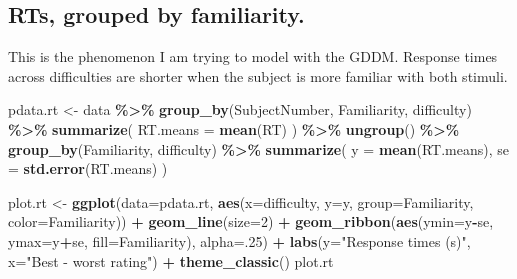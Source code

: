 \documentclass[
]{book}
\newenvironment{Shaded}{\begin{snugshade}}{\end{snugshade}}
\newcommand{\AttributeTok}[1]{\textcolor[rgb]{0.13,0.29,0.53}{#1}}
\newcommand{\DecValTok}[1]{\textcolor[rgb]{0.00,0.00,0.81}{#1}}
\newcommand{\FunctionTok}[1]{\textcolor[rgb]{0.13,0.29,0.53}{\textbf{#1}}}
\newcommand{\NormalTok}[1]{#1}
\newcommand{\OtherTok}[1]{\textcolor[rgb]{0.56,0.35,0.01}{#1}}
\newcommand{\SpecialCharTok}[1]{\textcolor[rgb]{0.81,0.36,0.00}{\textbf{#1}}}
\newcommand{\StringTok}[1]{\textcolor[rgb]{0.31,0.60,0.02}{#1}}
\begin{document}
\hypertarget{rts-grouped-by-familiarity.}{%
\subsection{RTs, grouped by familiarity.}\label{rts-grouped-by-familiarity.}}

This is the phenomenon I am trying to model with the GDDM. Response times across difficulties are shorter when the subject is more familiar with both stimuli.

\begin{Shaded}
\begin{Highlighting}[]
\NormalTok{pdata.rt }\OtherTok{\textless{}{-}}\NormalTok{ data }\SpecialCharTok{\%\textgreater{}\%}
  \FunctionTok{group\_by}\NormalTok{(SubjectNumber, Familiarity, difficulty) }\SpecialCharTok{\%\textgreater{}\%}
  \FunctionTok{summarize}\NormalTok{(}
    \AttributeTok{RT.means =} \FunctionTok{mean}\NormalTok{(RT)}
\NormalTok{  ) }\SpecialCharTok{\%\textgreater{}\%}
  \FunctionTok{ungroup}\NormalTok{() }\SpecialCharTok{\%\textgreater{}\%}
  \FunctionTok{group\_by}\NormalTok{(Familiarity, difficulty) }\SpecialCharTok{\%\textgreater{}\%}
  \FunctionTok{summarize}\NormalTok{(}
    \AttributeTok{y =} \FunctionTok{mean}\NormalTok{(RT.means),}
    \AttributeTok{se =} \FunctionTok{std.error}\NormalTok{(RT.means)}
\NormalTok{  )}

\NormalTok{plot.rt }\OtherTok{\textless{}{-}} \FunctionTok{ggplot}\NormalTok{(}\AttributeTok{data=}\NormalTok{pdata.rt, }\FunctionTok{aes}\NormalTok{(}\AttributeTok{x=}\NormalTok{difficulty, }\AttributeTok{y=}\NormalTok{y, }\AttributeTok{group=}\NormalTok{Familiarity, }\AttributeTok{color=}\NormalTok{Familiarity)) }\SpecialCharTok{+}
  \FunctionTok{geom\_line}\NormalTok{(}\AttributeTok{size=}\DecValTok{2}\NormalTok{) }\SpecialCharTok{+}
  \FunctionTok{geom\_ribbon}\NormalTok{(}\FunctionTok{aes}\NormalTok{(}\AttributeTok{ymin=}\NormalTok{y}\SpecialCharTok{{-}}\NormalTok{se, }\AttributeTok{ymax=}\NormalTok{y}\SpecialCharTok{+}\NormalTok{se, }\AttributeTok{fill=}\NormalTok{Familiarity), }\AttributeTok{alpha=}\NormalTok{.}\DecValTok{25}\NormalTok{) }\SpecialCharTok{+}
  \FunctionTok{labs}\NormalTok{(}\AttributeTok{y=}\StringTok{"Response times (s)"}\NormalTok{, }\AttributeTok{x=}\StringTok{"Best {-} worst rating"}\NormalTok{) }\SpecialCharTok{+}
  \FunctionTok{theme\_classic}\NormalTok{()}
\NormalTok{plot.rt}
\end{Highlighting}
\end{Shaded}
\end{document}
